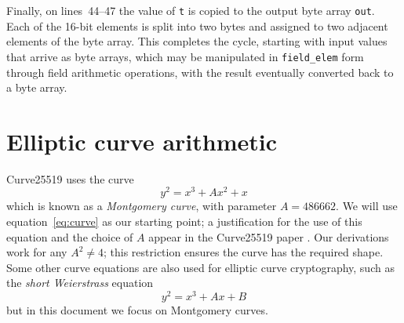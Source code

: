 \documentclass[manuscript]{acmart}
\begin{document}
Finally, on lines~44--47 the value of \verb|t| is copied to the output byte array \verb|out|.
Each of the 16-bit elements is split into two bytes and assigned to two adjacent elements of the byte array.
This completes the cycle, starting with input values that arrive as byte arrays, which may be manipulated in \verb|field_elem| form through field arithmetic operations, with the result eventually converted back to a byte array.

\section{Elliptic curve arithmetic}\label{sec:curve-arithmetic}

Curve25519 uses the curve
\begin{equation}\label{eq:curve}
y^2 = x^3 + A x^2 + x
\end{equation}
which is known as a \emph{Montgomery curve}, with parameter $A = 486662$.
We will use equation~\eqref{eq:curve} as our starting point; a justification for the use of this equation and the choice of $A$ appear in the Curve25519 paper \cite{Bernstein:2006kw}.
Our derivations work for any $A^2 \ne 4$; this restriction ensures the curve has the required shape.
Some other curve equations are also used for elliptic curve cryptography, such as the \emph{short Weierstrass} equation
\begin{equation}
y^2 = x^3 + Ax + B
\end{equation}
but in this document we focus on Montgomery curves.
\end{document}

